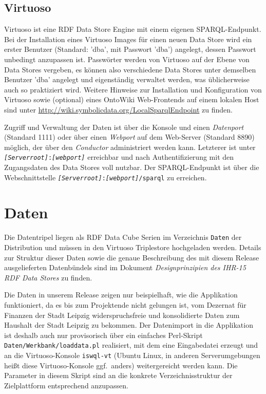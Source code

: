 \documentclass[a4paper,11pt,twoside]{article}
\begin{document}
\subsection{Virtuoso}

Virtuoso ist eine RDF Data Store Engine mit einem eigenen SPARQL-Endpunkt.
Bei der Installation eines Virtuoso Images für einen neuen Data Store wird ein
erster Benutzer (Standard: 'dba', mit Passwort 'dba') angelegt, dessen
Passwort unbedingt anzupassen ist.  Passwörter werden von Virtuoso auf der
Ebene von Data Stores vergeben, es können also verschiedene Data Stores unter
demselben Benutzer 'dba' angelegt und eigenständig verwaltet werden, was
üblicherweise auch so praktiziert wird. Weitere Hinweise zur Installation und
Konfiguration von Virtuoso sowie (optional) eines OntoWiki Web-Frontends auf
einem lokalen Host sind unter
\url{http://wiki.symbolicdata.org/LocalSparqlEndpoint} zu finden.

Zugriff und Verwaltung der Daten ist über die Konsole und einen
\emph{Datenport} (Standard 1111) oder über einen \emph{Webport} auf dem
Web-Server (Standard 8890) möglich, der über den \emph{Conductor} administriert
werden kann.  Letzterer ist unter
\texttt{\textit{[Serverroot]}:\textit{[webport]}} erreichbar und nach
Authentifizierung mit den Zugangsdaten des Data Stores voll nutzbar.  Der
SPARQL-Endpunkt ist über die Webschnittstelle
\texttt{\textit{[Serverroot]}:\textit{[webport]}/sparql} zu erreichen.

\section{Daten}

Die Datentripel liegen als RDF Data Cube Serien im Verzeichnis \texttt{Daten}
der Distribution und müssen in den Virtuoso Triplestore hochgeladen werden.
Details zur Struktur dieser Daten sowie die genaue Beschreibung des mit diesem
Release ausgelieferten Datenbündels sind im Dokument \emph{Designprinzipien des
  IHR-15 RDF Data Stores} zu finden.

Die Daten in unserem Release zeigen nur beispielhaft, wie die Applikation
funktioniert, da es bis zum Projektende nicht gelungen ist, vom Dezernat für
Finanzen der Stadt Leipzig widerspruchsfreie und konsolidierte Daten zum
Haushalt der Stadt Leipzig zu bekommen. Der Datenimport in die Applikation ist
deshalb auch nur provisorisch über ein einfaches Perl-Skript
\texttt{Daten/Werkbank/loaddata.pl} realisiert, mit dem eine Eingabedatei
erzeugt und an die Virtuoso-Konsole \texttt{iswql-vt} (Ubuntu Linux, in anderen
Serverumgebungen heißt diese Virtuoso-Konsole ggf.\ anders) weitergereicht
werden kann.  Die Parameter in diesem Skript sind an die konkrete
Verzeichnisstruktur der Zielplattform entsprechend anzupassen.
\end{document}
